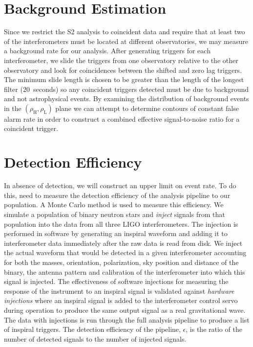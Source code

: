 \section{Background Estimation}
\label{s:background}

Since we restrict the S2 analysis to coincident data and require that at least
two of the interferometers must be located at different observatories, we may
measure a background rate for our analysis. After generating triggers for each
interferometer, we slide the triggers from one observatory relative to the
other observatory and look for coincidences between the shifted and zero lag
triggers. The minimum slide length is chosen to be greater than the length of
the longest filter ($20$~seconds) so any coincident triggers detected must be due to background and
not astrophysical events. By examining the distribution of background events
in the $(\rho_\mathrm{H},\rho_\mathrm{L})$ plane we can attempt to determine
contours of constant false alarm rate in order to construct a combined
effective signal-to-noise ratio for a coincident trigger\cite{abbott2004a}.

\section{Detection Efficiency}
\label{s:eff}

In absence of detection, we will construct an upper limit on event rate.  To
do this, need to measure the detection efficiency of the analysis pipeline to
our population. A Monte Carlo method is used to measure this efficiency. We
simulate a population of binary neutron stars and \emph{inject} signals from
that population into the data from all three LIGO interferometers. The
injection is performed in software by generating an inspiral waveform and
adding it to interferometer data immediately after the raw data is read from
disk. We inject the actual waveform that would be detected in a given
interferometer accounting for both the masses, orientation, polarization, sky
position and distance of the binary, the antenna pattern and calibration of
the interferometer into which this signal is injected.  The effectiveness of
software injections for measuring the response of the instrument to an
inspiral signal is validated against \emph{hardware injections}\cite{hw} where
an inspiral signal is added to the interferometer control servo during
operation to produce the same output signal as a real gravitational wave.  The
data with injections is run through the full analysis pipeline to produce a
list of inspiral triggers. The detection efficiency of the pipeline,
$\epsilon$, is the ratio of the number of detected signals to the number of
injected signals.
